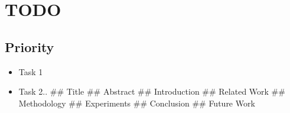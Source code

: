 \section{TODO}\label{todo}

\subsection{Priority}\label{priority}

\begin{itemize}
\itemsep1pt\parskip0pt
\item
  Task 1
\item
  Task 2.. \#\# Title \#\# Abstract \#\# Introduction \#\# Related Work
  \#\# Methodology \#\# Experiments \#\# Conclusion \#\# Future Work
\end{itemize}
